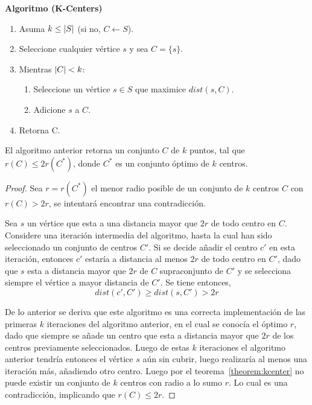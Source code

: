 \documentclass[../np-approximations.tex]{subfiles}
\begin{document}
\bigskip
\begin{tcolorbox}
	\textbf{Algoritmo (K-Centers)}
	\begin{enumerate}
		\item Asuma $k\le \left \vert S \right \vert$ (si no, $C \leftarrow S$).
		\item Seleccione cualquier vértice $s$ y sea $C=\{s\}$.
		\item Mientras $\left \vert C \right \vert < k$:
		      \begin{enumerate}
		      	\item Seleccione un vértice $s\in S$ que maximice $dist(s,C)$.
		      	\item Adicione $s$ a $C$.
		      \end{enumerate}
		\item Retorna C.
	\end{enumerate}
\end{tcolorbox}
\bigskip

\begin{theorem}
	El algoritmo anterior retorna un conjunto $C$ de $k$ puntos, 
	tal que $r(C) \le 2r(C^*)$, donde $C^*$ es un conjunto óptimo 
	de $k$ centros.
\end{theorem}

\begin{proof}
	Sea $r=r(C^*)$ el menor radio posible de un conjunto de $k$ 
	centros $C$ con $r(C) > 2r$, se intentará encontrar una 
	contradicción.
		
	Sea $s$ un vértice que esta a una distancia mayor que $2r$ de 
	todo centro en $C$. Considere una iteración intermedia del 
	algoritmo, hasta la cual han sido seleccionado un conjunto de 
	centros $C'$. Si se decide añadir el centro $c'$ en esta 
	iteración, entonces $c'$ estaría a distancia al menos $2r$ de 
	todo centro en $C'$, dado que $s$ esta a distancia mayor que 
	$2r$ de $C$ supraconjunto de $C'$ y se selecciona siempre el 
	vértice a mayor distancia de $C'$. Se tiene entonces,
	$$dist(c',C') \ge dist(s,C') > 2r$$
		
	De lo anterior se deriva que este algoritmo es una correcta 
	implementación de las primeras $k$ iteraciones del algoritmo 
	anterior, en el cual se conocía el óptimo $r$, dado que siempre 
	se añade un centro que esta a distancia mayor que $2r$ de los 
	centros previamente seleccionados. Luego de estas $k$ 
	iteraciones el algoritmo anterior tendría entonces el vértice 
	$s$ aún sin cubrir, luego realizaría al menos una iteración más,
	añadiendo otro centro. Luego por el
	teorema~\ref{theorem:kcenter} no puede existir un conjunto de 
	$k$ centros con radio a lo sumo $r$. Lo cual es una 
	contradicción, implicando que $r(C) \le 2r$.
\end{proof}
\end{document}
